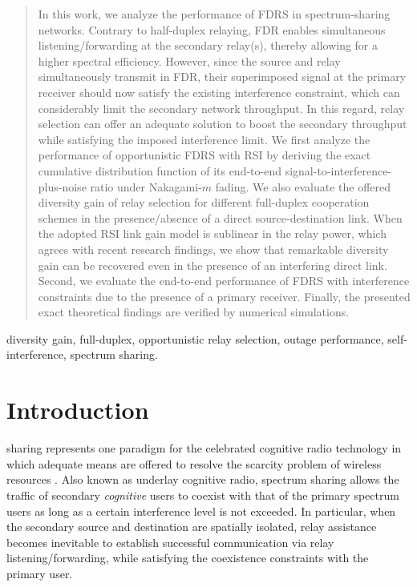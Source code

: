 \documentclass[10pt,journal]{IEEEtran}
\begin{document}
\begin{abstract}
In this work, we analyze the performance of \ac{FDRS} in spectrum-sharing networks. Contrary to half-duplex relaying, \ac{FDR} enables simultaneous listening/forwarding at the secondary relay(s), thereby allowing for a higher spectral efficiency. However, since the source and relay simultaneously transmit in \ac{FDR}, their superimposed signal at the primary receiver should now satisfy the existing interference constraint, which can considerably limit the secondary network throughput. In this regard, relay selection can offer an adequate solution to boost the secondary throughput while satisfying the imposed interference limit. We first analyze the performance of opportunistic \ac{FDRS} with \ac{RSI} by deriving the exact cumulative distribution function of its end-to-end signal-to-interference-plus-noise ratio under Nakagami-$m$ fading. We also evaluate the offered diversity gain of relay selection for different full-duplex cooperation schemes in the presence/absence of a direct source-destination link.  When the adopted \ac{RSI} link gain model is sublinear in the relay power, which agrees with recent research findings, we show that remarkable diversity gain can be recovered even in the presence of an interfering direct link. Second, we evaluate the end-to-end performance of \ac{FDRS} with interference constraints due to the presence of a primary receiver. Finally, the presented exact theoretical findings are verified by numerical simulations.
\end{abstract}
\begin{keywords}
diversity gain, full-duplex, opportunistic relay selection, outage performance, self-interference, spectrum sharing.
\end{keywords}

\acresetall

\section{Introduction}
 sharing represents one paradigm for the celebrated cognitive radio technology in which adequate means are offered to resolve the scarcity problem of wireless resources \cite{199908_PC_Cognitive_Mitola,200905_Proc_Cognitive_Goldsmith}. Also known as underlay cognitive radio, spectrum sharing  allows the traffic of secondary \emph{cognitive} users to coexist with that of the primary spectrum users as long as a certain interference level is not exceeded. In particular, when the secondary source and destination are spatially isolated, relay assistance becomes inevitable to establish successful communication via relay listening/forwarding, while satisfying the coexistence constraints with the primary user. 
\end{document}

